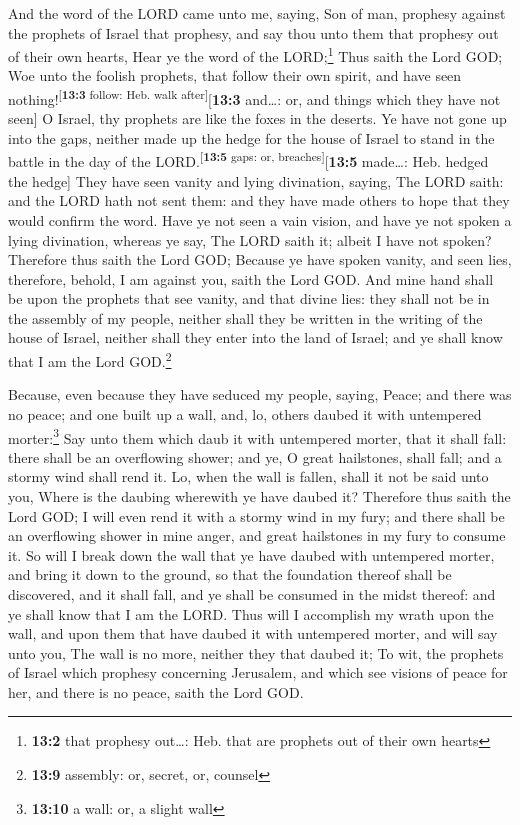  And the word of the LORD came unto me, saying,
 Son of man, prophesy against the prophets of Israel that
prophesy, and say thou unto them that prophesy out of their own hearts,
Hear ye the word of the LORD;\footnote{\textbf{13:2} that prophesy
  out\ldots: Heb. that are prophets out of their own hearts}
 Thus saith the Lord GOD; Woe unto the foolish prophets,
that follow their own spirit, and have seen
nothing!\textsuperscript{{[}\textbf{13:3} follow: Heb. walk
after{]}}{[}\textbf{13:3} and\ldots: or, and things which they have not
seen{]}  O Israel, thy prophets are like the foxes in the
deserts.  Ye have not gone up into the gaps, neither made
up the hedge for the house of Israel to stand in the battle in the day
of the LORD.\textsuperscript{{[}\textbf{13:5} gaps: or,
breaches{]}}{[}\textbf{13:5} made\ldots: Heb. hedged the hedge{]}
 They have seen vanity and lying divination, saying, The
LORD saith: and the LORD hath not sent them: and they have made others
to hope that they would confirm the word.  Have ye not
seen a vain vision, and have ye not spoken a lying divination, whereas
ye say, The LORD saith it; albeit I have not spoken? 
Therefore thus saith the Lord GOD; Because ye have spoken vanity, and
seen lies, therefore, behold, I am against you, saith the Lord GOD.
 And mine hand shall be upon the prophets that see vanity,
and that divine lies: they shall not be in the assembly of my people,
neither shall they be written in the writing of the house of Israel,
neither shall they enter into the land of Israel; and ye shall know that
I am the Lord GOD.\footnote{\textbf{13:9} assembly: or, secret, or,
  counsel}

 Because, even because they have seduced my people,
saying, Peace; and there was no peace; and one built up a wall, and, lo,
others daubed it with untempered morter:\footnote{\textbf{13:10} a wall:
  or, a slight wall}  Say unto them which daub it with
untempered morter, that it shall fall: there shall be an overflowing
shower; and ye, O great hailstones, shall fall; and a stormy wind shall
rend it.  Lo, when the wall is fallen, shall it not be
said unto you, Where is the daubing wherewith ye have daubed it?
 Therefore thus saith the Lord GOD; I will even rend it
with a stormy wind in my fury; and there shall be an overflowing shower
in mine anger, and great hailstones in my fury to consume it.
 So will I break down the wall that ye have daubed with
untempered morter, and bring it down to the ground, so that the
foundation thereof shall be discovered, and it shall fall, and ye shall
be consumed in the midst thereof: and ye shall know that I am the LORD.
 Thus will I accomplish my wrath upon the wall, and upon
them that have daubed it with untempered morter, and will say unto you,
The wall is no more, neither they that daubed it;  To
wit, the prophets of Israel which prophesy concerning Jerusalem, and
which see visions of peace for her, and there is no peace, saith the
Lord GOD.

